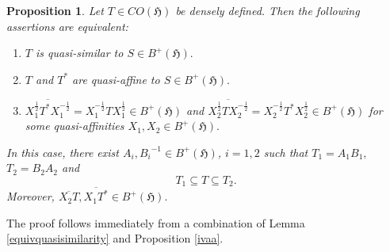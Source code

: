 \documentclass{amsart}
\makeatletter
\newtheorem{proposition}[theorem]{Proposition}
\newcommand{\h}{\mathfrak{H}}
\newcommand{\inv}{^{-1}}
\newcommand{\tstar}{T^{*}}
\newcommand{\half}{^{\frac{1}{2}}}
\newcommand{\mhalf}{^{-\frac{1}{2}}}
\newcommand{\inclu}{\subseteq}
\newcommand{\lplus}{B^{+}(\h)}
\numberwithin{equation}{section}
\renewenvironment{proof}[1][\proofname]{%
   \par\pushQED{\qed}\normalfont%
   \topsep6\p@\@plus6\p@\relax
   \trivlist\item[\hskip\labelsep\bfseries#1\@addpunct{.}]%
   \ignorespaces
}{%
   \popQED\endtrivlist\@endpefalse
}
\makeatother
\begin{document}
 \begin{proposition}
   Let $T\in CO(\h) $ be densely defined.
 Then the following assertions  are equivalent:
   \begin{enumerate}[\rm(i)]
       \item $T$ is quasi-similar to   $S \in
           \lplus.$
        \item $T$ and $\tstar$ are quasi-affine to $S \in \lplus.$
\item $ \overline{X_1\half \tstar            X_1\mhalf} = X_1\mhalf T X_1\half \in \lplus $ and  $ \overline{X_2\half T            X_2\mhalf} = X_2\mhalf \tstar X_2\half \in \lplus $  for some quasi-affinities $X_1,X_2 \in \lplus.$
  \end{enumerate}
  In this case, there exist  $ A_i, {B_i}\inv \in \lplus$, $i=1,2$ such that  $T_1=A_1 B_1,$   $T_2= B_2 A_2 $ and
  $$
   T_1 \inclu T \inclu  T_2 .
   $$
   Moreover, $
       \overline{X_2T},
        \overline{X_1 \tstar}  \in  \lplus.$
\end{proposition}

\begin{proof}
The proof follows immediately from a combination of Lemma \ref{equivquasisimilarity} and Proposition \ref{ivaa}.
\end{proof}




%

%



%
%
%
%
%
\end{document}
